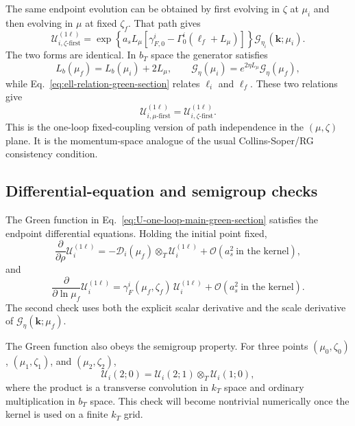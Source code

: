 \documentclass[11pt]{article}
\newcommand{\bk}{\bm{k}}
\newcommand{\ot}{\otimes_T}
\newcommand{\order}[1]{\mathcal{O}\!\left(#1\right)}
\begin{document}
The same endpoint evolution can be obtained by first evolving in $\zeta$ at $\mu_i$ and
then evolving in $\mu$ at fixed $\zeta_f$. That path gives
\begin{equation}
  \mathcal U_{i,\zeta\text{-first}}^{(1\ell)}
  =\exp\!\left\{
  a_sL_\mu\left[\gamma_{F,0}^i-\Gamma_0^i(\ell_f+L_\mu)\right]
  \right\}
  \mathcal G_{\eta_i}(\bk;\mu_i).
  \label{eq:U-zeta-first-green-section}
\end{equation}
The two forms are identical. In $b_T$ space the generator satisfies
\begin{equation}
  L_b(\mu_f)=L_b(\mu_i)+2L_\mu,
  \qquad
  \mathcal G_\eta(\mu_i)=e^{2\eta L_\mu}\mathcal G_\eta(\mu_f),
  \label{eq:G-scale-shift-green-section}
\end{equation}
while Eq.~\eqref{eq:ell-relation-green-section} relates $\ell_i$ and $\ell_f$. These two
relations give
\begin{equation}
  \mathcal U_{i,\mu\text{-first}}^{(1\ell)}
  =\mathcal U_{i,\zeta\text{-first}}^{(1\ell)}.
  \label{eq:path-independence-green-section}
\end{equation}
This is the one-loop fixed-coupling version of path independence in the $(\mu,\zeta)$
plane. It is the momentum-space analogue of the usual Collins-Soper/RG consistency
condition.

\subsection{Differential-equation and semigroup checks}

The Green function in Eq.~\eqref{eq:U-one-loop-main-green-section} satisfies the endpoint
differential equations. Holding the initial point fixed,
\begin{equation}
  \frac{\partial}{\partial\rho}\mathcal U_i^{(1\ell)}
  =-\mathcal D_i(\mu_f)\ot\mathcal U_i^{(1\ell)}
  +\order{a_s^2\ \text{in the kernel}},
  \label{eq:U-rho-eq-green-section}
\end{equation}
and
\begin{equation}
  \frac{\partial}{\partial\ln\mu_f}\mathcal U_i^{(1\ell)}
  =\gamma_F^i(\mu_f,\zeta_f)\,
  \mathcal U_i^{(1\ell)}
  +\order{a_s^2\ \text{in the kernel}}.
  \label{eq:U-mu-eq-green-section}
\end{equation}
The second check uses both the explicit scalar derivative and the scale derivative of
$\mathcal G_\eta(\bk;\mu_f)$.

The Green function also obeys the semigroup property. For three points
$(\mu_0,\zeta_0)$, $(\mu_1,\zeta_1)$, and $(\mu_2,\zeta_2)$,
\begin{equation}
  \mathcal U_i(2;0)=\mathcal U_i(2;1)\ot\mathcal U_i(1;0),
  \label{eq:semigroup-green-section}
\end{equation}
where the product is a transverse convolution in $k_T$ space and ordinary multiplication
in $b_T$ space. This check will become nontrivial numerically once the kernel is used on a
finite $k_T$ grid.
\end{document}
